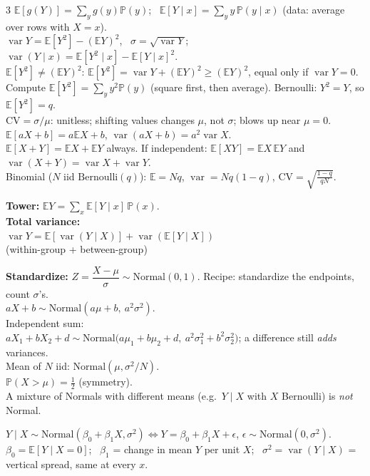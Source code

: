 \documentclass[11pt]{article}
\newcommand{\E}{\mathbb{E}}
\newcommand{\Var}{\operatorname{var}}
\renewcommand{\P}{\mathbb{P}}
\newcommand{\given}{\mid}
\newcommand{\Bern}{\text{Bernoulli}}
\newcommand{\Norm}{\text{Normal}}
\begin{document}
\begin{landscape}
\begin{multicols}{3}
$\E[g(Y)]=\sum_y g(y)\P(y)$; \ $\E[Y\given x]=\sum_y y\,\P(y\given x)$ (data: average over rows with $X{=}x$).\\
$\Var Y=\E[Y^2]-(\E Y)^2$, \ $\sigma=\sqrt{\Var Y}$; \ $\Var(Y\given x)=\E[Y^2\given x]-\E[Y\given x]^2$.\\
$\E[Y^2]\ne(\E Y)^2$: $\E[Y^2]=\Var Y+(\E Y)^2\ge(\E Y)^2$, equal only if $\Var Y=0$. Compute $\E[Y^2]=\sum_y y^2\P(y)$ (square first, then average). Bernoulli: $Y^2=Y$, so $\E[Y^2]=q$.\\
$\mathrm{CV}=\sigma/\mu$: unitless; shifting values changes $\mu$, not $\sigma$; blows up near $\mu=0$.\\
$\E[aX+b]=a\E X+b$, \quad $\Var(aX+b)=a^2\Var X$.\\
$\E[X+Y]=\E X+\E Y$ always. If independent: $\E[XY]=\E X\,\E Y$ and $\Var(X+Y)=\Var X+\Var Y$.\\
Binomial ($N$ iid $\Bern(q)$): $\E=Nq$, $\Var=Nq(1-q)$, $\mathrm{CV}=\sqrt{\tfrac{1-q}{qN}}$.

\begin{cbox}
\textbf{Tower:} $\E Y=\sum_x\E[Y\given x]\,\P(x)$.\\
\textbf{Total variance:}\\
$\Var Y=\E[\Var(Y\given X)]+\Var(\E[Y\given X])$\\
{\scriptsize (within-group + between-group)}
\end{cbox}

\textbf{Standardize:} $Z=\dfrac{X-\mu}{\sigma}\sim\Norm(0,1)$. Recipe: standardize the endpoints, count $\sigma$'s.\\
$aX+b\sim\Norm(a\mu+b,\ a^2\sigma^2)$.\\
Independent sum:\\
$aX_1+bX_2+d\sim\Norm\big(a\mu_1+b\mu_2+d,\ a^2\sigma_1^2+b^2\sigma_2^2\big)$; a difference still \emph{adds} variances.\\
Mean of $N$ iid: $\Norm(\mu,\sigma^2/N)$.\\
$\P(X>\mu)=\tfrac12$ (symmetry).\\
A mixture of Normals with different means (e.g.\ $Y\given X$ with $X$ Bernoulli) is \emph{not} Normal.

$Y\given X\sim\Norm(\beta_0+\beta_1X,\sigma^2)\iff Y=\beta_0+\beta_1X+\epsilon$, $\epsilon\sim\Norm(0,\sigma^2)$.\\
$\beta_0=\E[Y\given X{=}0]$; \ $\beta_1$ = change in mean $Y$ per unit $X$; \ $\sigma^2=\Var(Y\given X)$ = vertical spread, same at every $x$.


\end{multicols}
\end{landscape}
\end{document}
